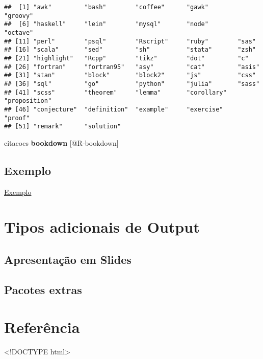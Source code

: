 \documentclass[
]{book}
\begin{document}
\begin{verbatim}
##  [1] "awk"         "bash"        "coffee"      "gawk"        "groovy"     
##  [6] "haskell"     "lein"        "mysql"       "node"        "octave"     
## [11] "perl"        "psql"        "Rscript"     "ruby"        "sas"        
## [16] "scala"       "sed"         "sh"          "stata"       "zsh"        
## [21] "highlight"   "Rcpp"        "tikz"        "dot"         "c"          
## [26] "fortran"     "fortran95"   "asy"         "cat"         "asis"       
## [31] "stan"        "block"       "block2"      "js"          "css"        
## [36] "sql"         "go"          "python"      "julia"       "sass"       
## [41] "scss"        "theorem"     "lemma"       "corollary"   "proposition"
## [46] "conjecture"  "definition"  "example"     "exercise"    "proof"      
## [51] "remark"      "solution"
\end{verbatim}

citacoes \textbf{bookdown} {[}@R-bookdown{]}

\hypertarget{exemplo}{%
\section{Exemplo}\label{exemplo}}

\href{exemplos/104-intro_blocos_de_codigo.html}{Exemplo}

\hypertarget{tipos-adicionais-de-output}{%
\chapter{Tipos adicionais de Output}\label{tipos-adicionais-de-output}}

\hypertarget{apresentauxe7uxe3o-em-slides}{%
\section{Apresentação em Slides}\label{apresentauxe7uxe3o-em-slides}}

\hypertarget{pacotes-extras}{%
\section{Pacotes extras}\label{pacotes-extras}}

\hypertarget{referuxeancia}{%
\chapter{Referência}\label{referuxeancia}}

\textless!DOCTYPE html\textgreater{}
\end{document}
